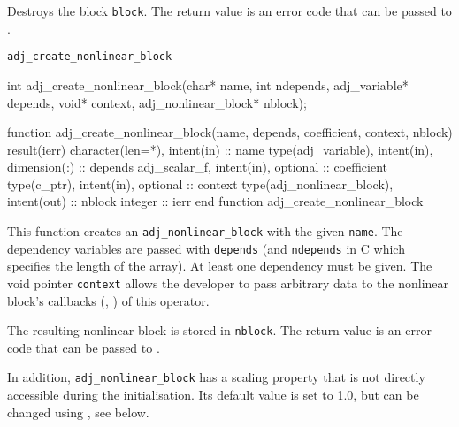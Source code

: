 Destroys the block \texttt{block}.
The return value is an error code that can be passed to .



\begin{boxwithtitle}{\texttt{adj_create_nonlinear_block}}
\begin{minipage}{\columnwidth}
\begin{ccode}
  int adj_create_nonlinear_block(char* name, int ndepends, adj_variable* depends, 
                                 void* context, adj_nonlinear_block* nblock);
\end{ccode}
\begin{fortrancode}
  function adj_create_nonlinear_block(name, depends, coefficient, context, nblock) 
           result(ierr)
    character(len=*), intent(in) :: name
    type(adj_variable), intent(in), dimension(:) :: depends
    adj_scalar_f, intent(in), optional :: coefficient
    type(c_ptr), intent(in), optional :: context
    type(adj_nonlinear_block), intent(out) :: nblock
    integer :: ierr
  end function adj_create_nonlinear_block
\end{fortrancode}
\end{minipage}
\end{boxwithtitle}
This function creates an \texttt{adj_nonlinear_block} with the given \texttt{name}.
The dependency variables are passed with \texttt{depends} (and \texttt{ndepends} in C which specifies the length of the array).
At least one dependency must be given.
The void pointer \texttt{context} allows the developer to pass arbitrary data to the nonlinear block's callbacks (, ) of this operator.

The resulting nonlinear block is stored in \texttt{nblock}. 
The return value is an error code that can be passed to .

In addition, \texttt{adj_nonlinear_block} has a scaling property that is not directly accessible during the initialisation. 
Its default value is set to 1.0, but can be changed using , see below.


